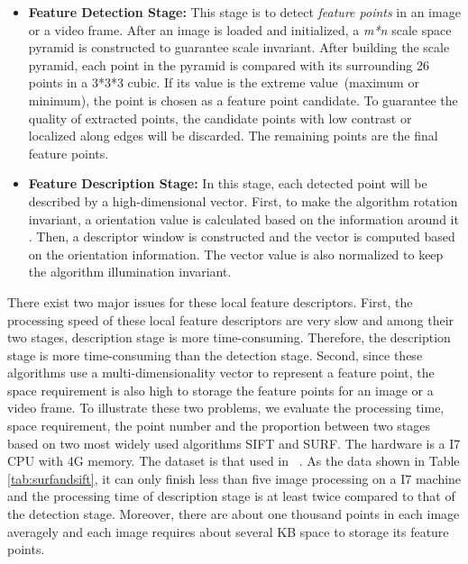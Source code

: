 \begin{itemize}
\setlength{\itemsep}{0mm}


\item \textbf{Feature Detection Stage:} This stage is to detect \emph{feature points} in an image or a video frame. After an image is loaded and initialized, a \emph{m*n} scale space pyramid is constructed to guarantee scale invariant.  After building the scale pyramid, each point in the pyramid is compared with its
surrounding 26 points in a 3*3*3 cubic. If its value is the extreme value~(maximum or minimum), the point is chosen as a feature point candidate. To guarantee the quality of extracted points, the candidate points with low contrast or localized along edges will be discarded. The remaining points are the final feature points.

\item \textbf{Feature Description Stage:} In this stage, each detected point will be described by a high-dimensional vector. First, to make the algorithm rotation invariant, a orientation value is calculated based on the information around it . Then, a descriptor window is constructed and the vector is computed based on the orientation information. The vector value is also normalized to keep the algorithm illumination invariant.
\end{itemize}


There exist two major issues for these local feature descriptors. First, the processing speed of these local feature descriptors are very slow and among their two stages, description stage is more time-consuming. Therefore, the description stage is more time-consuming than the detection stage. Second, since these algorithms use a multi-dimensionality vector to represent a feature point, the space requirement is also high to storage the feature points for an image or a video frame. To illustrate these two problems, we evaluate the processing time, space requirement, the point number and the proportion between two stages based on two most widely used algorithms SIFT and SURF. The hardware is a I7 CPU with 4G memory. The dataset is that used in ~\cite{mikolajczyk2005performance}. As the data shown in Table \ref{tab:surfandsift}, it can only finish less than five image processing on a I7 machine and the processing time of description stage is at least twice compared to that of the detection stage. Moreover, there are about one thousand points in each image averagely and each image requires about several KB space to storage its feature points.

